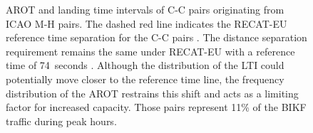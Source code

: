 \begin{figure}[h]
    \centering
    
    
    \caption[AROT and LTI of C-C pairs originating from ICAO M-H pairs]{AROT and landing time intervals of C-C pairs originating from ICAO M-H pairs. The dashed red line indicates the RECAT-EU reference time separation for the C-C pairs \protect{}. The distance separation requirement remains the same under RECAT-EU with a reference time of 74~seconds \protect{}. Although the distribution of the LTI could potentially move closer to the reference time line, the frequency distribution of the AROT restrains this shift and acts as a limiting factor for increased capacity. Those pairs represent 11\% of the BIKF traffic during peak hours.}
    \label{fig:CC_from_MH_pairs_time_sep}
\end{figure}

